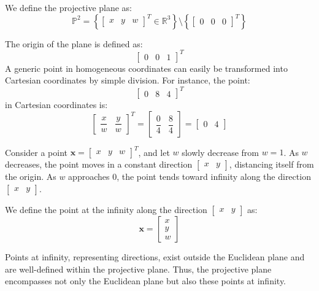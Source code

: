 \begin{definition}
    We define the projective plane as:
    \[\mathbb{P}^2=\left\{{\begin{bmatrix} x & y & w \end{bmatrix}}^T \in \mathbb{R}^3\right\}\setminus\left\{{\begin{bmatrix} 0 & 0 & 0 \end{bmatrix}}^T\right\}\]
\end{definition}
\begin{example}
    The origin of the plane is defined as: 
    \[{\begin{bmatrix} 0 & 0 & 1 \end{bmatrix}}^T\]
    A generic point in homogeneous coordinates can easily be transformed into Cartesian coordinates by simple division.
    For instance, the point:
    \[{\begin{bmatrix} 0 & 8 & 4 \end{bmatrix}}^T\]
    in Cartesian coordinates is: 
    \[{\begin{bmatrix} \dfrac{x}{w} & \dfrac{y}{w} \end{bmatrix}}^T=\begin{bmatrix} \dfrac{0}{4} & \dfrac{8}{4} \end{bmatrix}=\begin{bmatrix} 0 & 4 \end{bmatrix}\]
\end{example}
Consider a point $\mathbf{x}={\begin{bmatrix} x & y & w \end{bmatrix}}^T$, and let $w$ slowly decrease from $w=1$. 
As $w$ decreases, the point moves in a constant direction $\begin{bmatrix} x & y \end{bmatrix}$, distancing itself from the origin.
As $w$ approaches $0$, the point tends toward infinity along the direction $\begin{bmatrix} x & y \end{bmatrix}$. 
\begin{definition}
    We define the point at the infinity along the direction $\begin{bmatrix} x & y \end{bmatrix}$ as: 
    \[\mathbf{x} = \begin{bmatrix} x \\ y \\ w \end{bmatrix}\]
\end{definition}
Points at infinity, representing directions, exist outside the Euclidean plane and are well-defined within the projective plane. 
Thus, the projective plane encompasses not only the Euclidean plane but also these points at infinity.